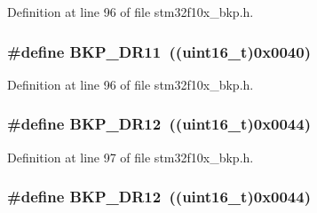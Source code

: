 Definition at line 96 of file stm32f10x\+\_\+bkp.\+h.

\subsubsection[{\texorpdfstring{B\+K\+P\+\_\+\+D\+R11}{BKP_DR11}}]{\setlength{\rightskip}{0pt plus 5cm}\#define B\+K\+P\+\_\+\+D\+R11~(({\bf uint16\+\_\+t})0x0040)}\hypertarget{group___data___backup___register_ga7784d76b7357c12fcc2dce349b3d7b6f}{}\label{group___data___backup___register_ga7784d76b7357c12fcc2dce349b3d7b6f}


Definition at line 96 of file stm32f10x\+\_\+bkp.\+h.

\subsubsection[{\texorpdfstring{B\+K\+P\+\_\+\+D\+R12}{BKP_DR12}}]{\setlength{\rightskip}{0pt plus 5cm}\#define B\+K\+P\+\_\+\+D\+R12~(({\bf uint16\+\_\+t})0x0044)}\hypertarget{group___data___backup___register_ga56c63e631781366c4c0c289a27eb325f}{}\label{group___data___backup___register_ga56c63e631781366c4c0c289a27eb325f}


Definition at line 97 of file stm32f10x\+\_\+bkp.\+h.

\subsubsection[{\texorpdfstring{B\+K\+P\+\_\+\+D\+R12}{BKP_DR12}}]{\setlength{\rightskip}{0pt plus 5cm}\#define B\+K\+P\+\_\+\+D\+R12~(({\bf uint16\+\_\+t})0x0044)}\hypertarget{group___data___backup___register_ga56c63e631781366c4c0c289a27eb325f}{}\label{group___data___backup___register_ga56c63e631781366c4c0c289a27eb325f}


